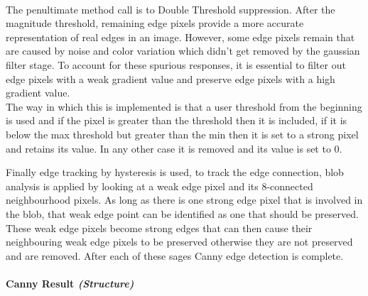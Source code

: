 \begin{FlushLeft}
\begin{itemize}
    \end{itemize}
    
    \\ \bk

    The penultimate method call is to Double Threshold suppression. After the magnitude threshold, remaining edge pixels provide a more accurate representation of real edges in an image. However, some edge pixels remain that are caused by noise and color variation which didn't get removed by the gaussian filter stage. To account for these spurious responses, it is essential to filter out edge pixels with a weak gradient value and preserve edge pixels with a high gradient value. \\

    The way in which this is implemented is that a user threshold from the beginning is used and if the pixel is greater than the threshold then it is included, if it is below the max threshold but greater than the min then it is set to a strong pixel and retains its value. In any other case it is removed and its value is set to 0. \\ \bk

    Finally edge tracking by hysteresis is used, to track the edge connection, blob analysis is applied by looking at a weak edge pixel and its 8-connected neighbourhood pixels. As long as there is one strong edge pixel that is involved in the blob, that weak edge point can be identified as one that should be preserved. These weak edge pixels become strong edges that can then cause their neighbouring weak edge pixels to be preserved otherwise they are not preserved and are removed. After each of these sages Canny edge detection is complete. \\ \bk    
    \bk

    \pagebreak
    \paragraph{Canny Result \textit{(Structure)}} \mbox{} \\

    \begin{figure}[H]
        \centering
    \end{figure}\\


\end{FlushLeft}
